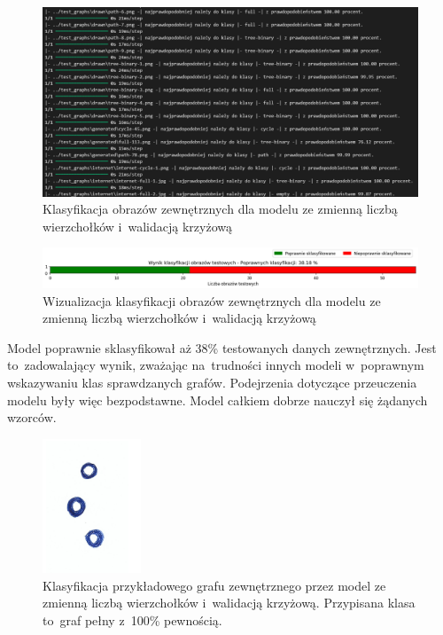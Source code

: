 \begin{figure}[ht]
	\centering
	\includegraphics[width=15.5cm]{resources/tests/images/v3/multiple_edges_crossvalid_txt.png}
	\caption{Klasyfikacja obrazów zewnętrznych dla modelu ze zmienną liczbą wierzchołków i~walidacją krzyżową}
	\label{Fig:tests-csvar-0b}
\end{figure}
\FloatBarrier

\begin{figure}[ht]
	\centering
	\includegraphics[width=15.5cm]{resources/tests/images/v3/multiple_edges_crossvalid_bar.png}
	\caption{Wizualizacja klasyfikacji obrazów zewnętrznych dla modelu ze zmienną liczbą wierzchołków i~walidacją krzyżową}
	\label{Fig:tests-csvar-0c}
\end{figure}
\FloatBarrier

Model poprawnie sklasyfikował aż 38\% testowanych danych zewnętrznych.
Jest to~zadowalający wynik, zważając na~trudności innych modeli w~poprawnym wskazywaniu klas sprawdzanych grafów.
Podejrzenia dotyczące przeuczenia modelu były więc bezpodstawne.
Model całkiem dobrze nauczył się żądanych wzorców.

\begin{figure}[ht]
	\centering
	\includegraphics[height=4cm]{../graph_classification/test_graphs/drawn/empty-5.png}
	\caption{Klasyfikacja przykładowego grafu zewnętrznego przez model ze zmienną liczbą wierzchołków i~walidacją krzyżową.
		Przypisana klasa to~graf pełny z~100\% pewnością.}
	\label{Fig:tests-csvar-0d}
\end{figure}
\FloatBarrier

